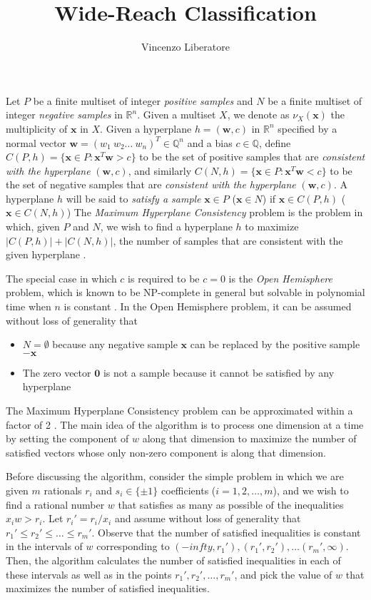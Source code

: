 \documentclass[11pt]{article}
\title{Wide-Reach Classification}
\author{Vincenzo Liberatore}
\theoremstyle{definition}
\newcommand{\R}{\mathbb{R}}
\newcommand{\Q}{\mathbb{Q}}
\newcommand{\vect}[1]{\mathbf{#1}}
\begin{document}
\maketitle

Let $P$ be a finite multiset of integer {\em positive samples\/} and 
$N$ be a finite multiset of integer {\em negative samples\/} in $\R^n$.
Given a multiset $X$, we denote as $\nu_X(\vect{x})$ the multiplicity of $\vect{x}$ in $X$. 
Given a hyperplane $h = (\vect{w}, c)$ in $\R^n$ 
specified by a normal vector $\vect{w} = (w_1 ~ w_2 \dots ~ w_n)^T \in \Q^n$ and a bias $c \in \Q$,
define $C(P, h) = \{ \vect{x} \in P : \vect{x}^T \vect{w} > c \}$
to be the set of positive samples that are {\em consistent with the hyperplane\/} $(\vect{w}, c)$,
and similarly $C(N, h) = \{ \vect{x} \in P : \vect{x}^T \vect{w} < c \}$
to be the set of negative samples that are {\em consistent with the hyperplane\/} $(\vect{w}, c)$.
A hyperplane $h$ will be said to {\em satisfy a sample\/} 
$\vect{x} \in P$ ($\vect{x} \in N$)
if $\vect{x} \in C(P, h)$ ($\vect{x} \in C(N, h)$)
The {\em Maximum Hyperplane Consistency\/} problem is the problem in which,
given $P$ and $N$, we wish to find a hyperplane $h$
to maximize $|C(P, h)| + |C(N, h)|$, the number of samples 
that are consistent with the given hyperplane \cite{countingapprox}.


The special case in which $c$ is required to be $c = 0$ is the {\em Open Hemisphere\/} problem,
which is known to be NP-complete in general but solvable in polynomial time
when $n$ is constant \cite{densehemisphere}.
In the Open Hemisphere problem, it can be assumed without loss of generality that 
\begin{itemize} 
\item $N = \emptyset$ because 
any negative sample $\vect{x}$ can be replaced by the positive sample $-\vect{x}$
\item The zero vector $\vect{0}$ is not a sample because it cannot be satisfied by any hyperplane
\end{itemize}

The Maximum Hyperplane Consistency problem can be approximated within a factor of 2 \cite{countingapprox}.
The main idea of the algorithm is to process one dimension at a time 
by setting the component of $w$ along that dimension to maximize the number of satisfied vectors
whose only non-zero component is along that dimension.

\iffalse
Before discussing the algorithm, 
consider the simple problem in which we are given $m$ rationals $r_i$ and 
$s_i \in \{ \pm 1 \}$ coefficients ($i = 1, 2, \dots, m$),
and we wish to find a rational number $w$ that satisfies as many as possible of the inequalities
$x_i w > r_i$.
Let $r_i' = r_i / x_i$ and assume without loss of generality that 
$r_1' \leq r_2' \leq \dots \leq r_m'$.
Observe that the number of satisfied inequalities is constant in the 
intervals of $w$ corresponding to
$(-infty, r_1'), (r_1', r_2'), \dots (r_m', \infty)$.
Then, the algorithm calculates the number of satisfied inequalities in each of these intervals 
as well as in the points $r_1', r_2', \dots, r_m'$, and pick the
value of $w$ that maximizes the number of satisfied inequalities. 
\end{document}
